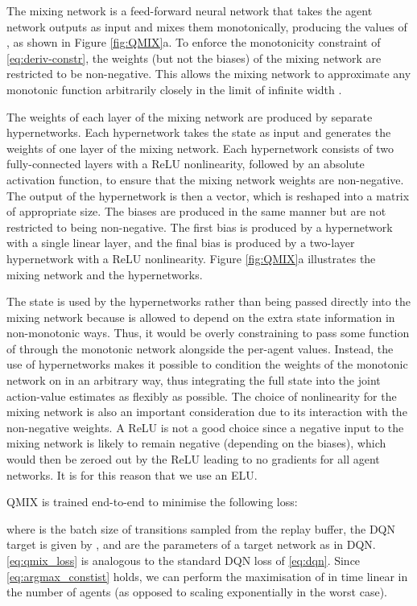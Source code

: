 \documentclass[twoside,11pt]{article}
\begin{document}
The mixing network is a feed-forward neural network that takes the agent 
network outputs as input and mixes them monotonically, producing the values of 
, as shown in Figure \ref{fig:QMIX}a. To enforce the monotonicity 
constraint of \eqref{eq:deriv-constr}, the weights (but not the biases) of the 
mixing network are restricted to be non-negative. This allows the mixing 
network to approximate any monotonic function arbitrarily closely in the limit 
of infinite width \citep{Dugas_2009}.


The weights of each layer of the mixing network are produced by separate 
hypernetworks. Each hypernetwork takes the state  as input and generates the 
weights of one layer of the mixing network. 
Each hypernetwork consists of two fully-connected layers with a ReLU nonlinearity, followed by an absolute activation function, to ensure 
that the mixing network weights are non-negative. The output of the 
hypernetwork is then a vector, which is reshaped into a matrix of appropriate 
size. 
The biases are produced in the same manner but are not restricted to 
being non-negative. 
The first bias is produced by a hypernetwork with a single linear layer, and the final bias is produced by a two-layer hypernetwork with a 
ReLU nonlinearity. Figure \ref{fig:QMIX}a illustrates the mixing network and 
the hypernetworks.

The state is used by the hypernetworks rather than being passed directly into the mixing network because  is allowed to depend on the extra state 
information in non-monotonic ways. Thus, it would be overly constraining to pass some function of  through the monotonic network alongside the 
per-agent values.
Instead, the use of hypernetworks makes it possible to condition the 
weights of the monotonic network on  in an arbitrary way, thus 
integrating the full state  into the joint action-value estimates as 
flexibly as possible.
The choice of nonlinearity for the mixing network is also an important consideration due to its interaction with the non-negative weights.
A ReLU is not a good choice since a negative input to the mixing network is likely to remain negative (depending on the biases), which would then be zeroed out by the ReLU leading to no gradients for all agent networks. 
It is for this reason that we use an ELU.


QMIX is trained end-to-end to minimise the following loss:
 
where  is the batch size of transitions sampled from the replay buffer, the DQN target is given by , and  are the parameters of a target network as in DQN. \eqref{eq:qmix_loss} is analogous to the standard DQN loss of \eqref{eq:dqn}. Since \eqref{eq:argmax_constist} holds, we can perform the maximisation of  in time linear in the number of agents (as opposed to scaling exponentially in the worst case). 
\end{document}
